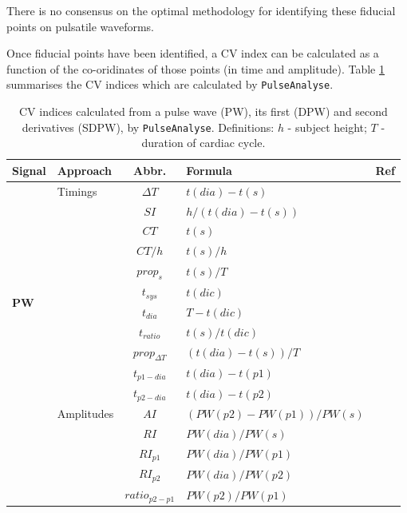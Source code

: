 \documentclass[12pt]{iopart}
\newcommand{\pa}{\texttt{PulseAnalyse}}
\begin{document}
There is no consensus on the optimal methodology for identifying these fiducial points on pulsatile waveforms.

Once fiducial points have been identified, a CV index can be calculated as a function of the co-oridinates of those points (in time and amplitude). Table \ref{tab:SIs_res} summarises the CV indices which are calculated by \pa.

\begin{table}[t]
	\caption{\label{tab:SIs_res} CV indices calculated from a pulse wave (PW), its first (DPW) and second derivatives (SDPW), by \pa. Definitions: $h$ - subject height; $T$ - duration of cardiac cycle.}
	\vspace{0.5cm}
	\centering
	\renewcommand{\arraystretch}{1.2}
	\footnotesize
	\begin{tabular}{p{2cm}p{2cm}cp{8.3cm}c}
		\hline
		\textbf{Signal} & \textbf{Approach} & \textbf{Abbr.} & \textbf{Formula} & \textbf{Ref} \\
		\hline
		\multirow{12}{*}{\textbf{PW}} & Timings & $\Delta T$ & $t(dia) - t(s)$ & \cite{Chowienczyk1999} \\
		& & $SI$ & $h / (t(dia) - t(s))$ & \cite{Millasseau2002} \\
		& & $CT$ & $t(s)$ & \cite{Alty2003} \\
		& & $CT/h$& $t(s)/h \:$ & \cite{Wu2010} \\
		& & $prop_s$ & $t(s)/T$ & \cite{Wu2010} \\
		& & $t_{sys}$ & $t(dic)$ & \cite{Ahn2017} \\
		& & $t_{dia}$ & $T - t(dic)$ & \cite{Ahn2017} \\
		& & $t_{ratio}$ & $t(s) / t(dic)$ & \cite{Ahn2017} \\
		& & $prop_{\Delta T}$ & $(t(dia) - t(s)) / T$ & \cite{Ahn2017} \\
		& & $t_{p1-dia}$ & $t(dia) - t(p1)$ & \cite{Peltokangas2017a} \\
		& & $t_{p2-dia}$ & $ t(dia) - t(p2)$ & \cite{Peltokangas2017a} \\
		& Amplitudes & $AI$ & $(PW(p2) - PW(p1)) / PW(s)$ & \cite{Takazawa1998} \\ 
		& & $RI$ & $PW(dia) / PW(s)$ & \cite{Chowienczyk1999} \\
		& & $RI_{p1}$ & $PW(dia) / PW(p1)$ & \cite{Peltokangas2017a} \\
		& & $RI_{p2}$ & $PW(dia) / PW(p2)$ & \cite{Peltokangas2017a} \\
		& & $ratio_{p2-p1}$ & $PW(p2)  / PW(p1)$ & \cite{Peltokangas2017a} \\

\end{tabular}
\end{table}
\end{document}
